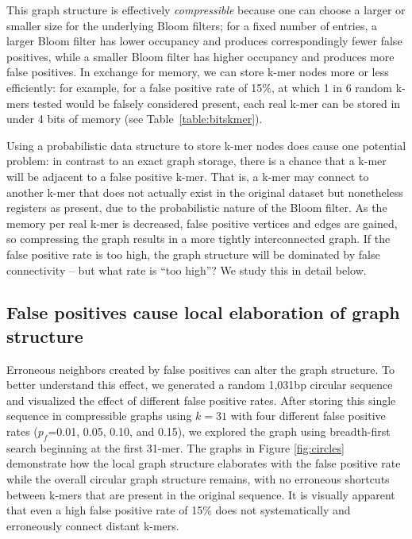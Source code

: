 \documentclass{pnastwo}
\begin{document}
\begin{article}
This graph structure is effectively {\em compressible} because one can
choose a larger or smaller size for the underlying Bloom filters; for
a fixed number of entries, a larger Bloom filter has lower occupancy
and produces correspondingly fewer false positives, while a smaller
Bloom filter has higher occupancy and produces more false
positives. In exchange for memory, we can store k-mer nodes more or
less efficiently: for example, for a false positive rate of 15\%, at
which 1 in 6 random k-mers tested would be falsely considered present,
each real k-mer can be stored in under 4 bits of memory (see
Table~\ref{table:bitskmer}).

Using a probabilistic data structure to store k-mer nodes does
cause one potential problem: in contrast to an exact graph storage, there is a chance that a k-mer
will be adjacent to a false positive k-mer.  That is, a k-mer may
connect to another k-mer that does not actually exist in the original
dataset but nonetheless registers as present, due to the probabilistic
nature of the Bloom filter.  As the memory per real k-mer is
decreased, false positive vertices and edges are gained, so
compressing the graph results in a more tightly interconnected graph.
If the false positive rate is too high, the graph structure will be
dominated by false connectivity -- but what rate is ``too high''?  We
study this in detail below.

\subsection{False positives cause local elaboration of graph structure}

Erroneous neighbors created by false positives can alter the graph
structure.  To better understand this effect, we generated a random
1,031bp circular sequence and visualized the effect of different false
positive rates.  After storing this single sequence in compressible
graphs using $k=31$ with four different false positive rates
($p_f$=0.01, 0.05, 0.10, and 0.15), we explored the graph using
breadth-first search beginning at the first 31-mer.  The graphs in
Figure \ref{fig:circles} demonstrate how the local graph structure elaborates with the
false positive rate while the overall circular graph structure
remains, with no erroneous shortcuts between k-mers that are present
in the original sequence.  It is visually apparent that even a high false positive rate of 15\% does not systematically and erroneously connect distant k-mers.


\end{article}
\end{document}
